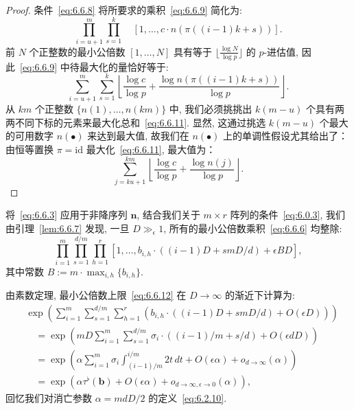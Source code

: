 \begin{proof}
条件~\eqref{eq:6.6.8} 将所要求的乘积~\eqref{eq:6.6.9} 简化为:
\begin{equation}\label{eq:6.6.10}
\prod_{i=u+1}^{m} \prod_{s=1}^{k} \quad [1, \dots, c \cdot n (\pi ((i-1)k+s))].
\end{equation}
前 $N$ 个正整数的最小公倍数 $[1, \dots, N]$ 具有等于 $\lfloor \frac{\log N}{\log p} \rfloor$ 的 $p$-进估值, 因此~\eqref{eq:6.6.9} 中待最大化的量恰好等于:
\begin{equation}\label{eq:6.6.11}
\sum_{i=u+1}^{m} \sum_{s=1}^{k} \left\lfloor \frac{\log c}{\log p} + \frac{\log n \left( \pi \left( (i-1)k + s \right) \right)}{\log p} \right\rfloor.
\end{equation}
从 $km$ 个正整数 $\{n(1), \dots, n(km)\}$ 中, 我们必须挑挑出 $k(m - u)$ 个具有两两不同下标的元素来最大化总和~\eqref{eq:6.6.11}.
显然, 这通过挑选 $k(m-u)$ 个最大的可用数字 $n(\bullet)$ 来达到最大值, 故我们在 $n(\bullet)$ 上的单调性假设尤其给出了：由恒等置换 $\pi = \mathrm{id}$ 最大化~\eqref{eq:6.6.11}, 最大值为：
\[ \sum_{j=ku+1}^{km} \left\lfloor \frac{\log c}{\log p} + \frac{\log n(j)}{\log p} \right\rfloor. \]
\end{proof}

将~\eqref{eq:6.6.3} 应用于非降序列 $\mathbf{n}$, 结合我们关于 $m \times r$ 阵列的条件~\eqref{eq:6.0.3}, 我们由引理~\ref{lem:6.6.7} 发现, 一旦 $D \gg_{\epsilon} 1$, 所有的最小公倍数乘积~\eqref{eq:6.6.6} 均整除:
\begin{equation}\label{eq:6.6.12}
\prod_{i=1}^{m} \prod_{s=1}^{d/m} \prod_{h=1}^{r} \left[ 1, \dots, b_{i,h} \cdot \left( (i-1)D + smD/d \right) + \epsilon BD \right],
\end{equation}
其中常数 $B := m \cdot \max_{i,h} \{b_{i,h}\}.$

由素数定理, 最小公倍数上限~\eqref{eq:6.6.12} 在 $D \to \infty$ 的渐近下计算为:
\begin{align}
&\exp\left(\sum_{i=1}^{m}\sum_{s=1}^{d/m}\sum_{h=1}^{r}\left(b_{i,h}\cdot\left((i-1)D+smD/d\right)+O(\epsilon D)\right)\right) \nonumber\\
&\quad =\exp\left(mD\sum_{i=1}^{m}\sum_{s=1}^{d/m}\sigma_{i}\cdot\left((i-1)/m+s/d\right)+O(\epsilon dD)\right) \nonumber\\
&\quad =\exp\left(\alpha\sum_{i=1}^{m}\sigma_{i}\int_{(i-1)/m}^{i/m}2t\,dt+O(\epsilon\alpha)+o_{d\to\infty}(\alpha)\right) \nonumber\\
&\quad =\exp\left(\alpha\tau^{\flat}(\mathbf{b})+O(\epsilon\alpha)+o_{d\to\infty,\epsilon\to0}(\alpha)\right),\label{eq:6.6.13}
\end{align}
回忆我们对消亡参数 $\alpha = mdD/2$ 的定义~\eqref{eq:6.2.10}.

